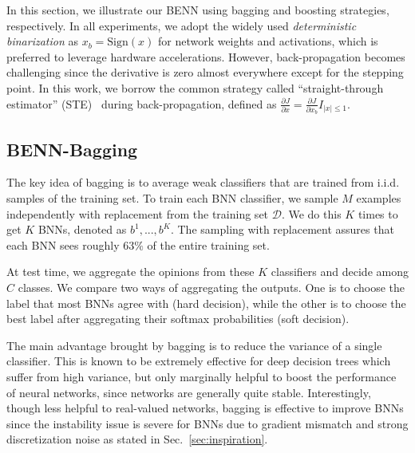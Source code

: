 \documentclass[10pt,twocolumn,letterpaper]{article}
\begin{document}
\label{sec:method}
In this section, we illustrate our BENN using bagging and boosting strategies, respectively. %
In all experiments, we adopt the widely used \emph{deterministic binarization} as $x_{b} = \text{Sign}(x)$ for network weights and activations, which is preferred to leverage hardware accelerations. %
However, back-propagation becomes challenging since the derivative is zero almost everywhere except for the stepping point. In this work, we borrow the common strategy called ``straight-through estimator'' (STE)~\cite{hinton} during back-propagation, defined as $\frac{\partial J}{\partial x} = \frac{\partial J}{\partial x_{b}}I_{|x| \leq 1}$. 

\subsection{BENN-Bagging}

The key idea of bagging is to average weak classifiers that are trained from i.i.d. samples of the training set.
To train each BNN classifier, we sample $M$ examples independently with replacement from the training set $\mathcal{D}$. We do this $K$ times to get $K$ BNNs, denoted as $b^{1}, ..., b^{K}$. The sampling with replacement assures that each BNN sees roughly $63\%$ of the entire training set.

At test time, we aggregate the opinions from these $K$ classifiers and decide among $C$ classes. We compare two ways of aggregating the outputs. One is to choose the label that most BNNs agree with (hard decision), while the other is to choose the best label after aggregating their softmax probabilities (soft decision). %

The main advantage brought by bagging is to reduce the variance of a single classifier. This is known to be extremely effective for deep decision trees which suffer from high variance, but only marginally helpful to boost the performance of neural networks, since networks are generally quite stable. 
Interestingly, though less helpful to real-valued networks, bagging is effective to improve BNNs since the instability issue is severe for BNNs due to gradient mismatch and strong discretization noise as stated in Sec.~\ref{sec:inspiration}. %
\end{document}
